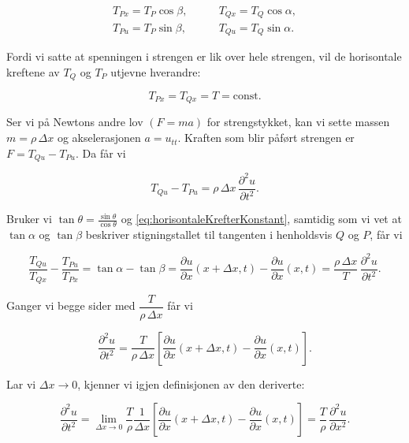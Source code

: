 \begin{align*}
  T_{Px} = T_P \cos\beta, &\qquad T_{Qx} = T_Q \cos\alpha,\\
  T_{Pu} = T_P \sin\beta, &\qquad T_{Qu} = T_Q \sin\alpha.
\end{align*}

Fordi vi satte at spenningen i strengen er lik over hele strengen, vil de horisontale kreftene
av \(T_Q\) og \(T_P\) utjevne hverandre:

\begin{equation}
  T_{Px} = T_{Qx} = T = \text{const.}
  \label{eq:horisontaleKrefterKonstant}
\end{equation}

Ser vi på Newtons andre lov \((F=ma)\) for strengstykket, kan vi sette massen \(m=\rho\,\Delta x\) og
akselerasjonen \(a=u_{tt}\). Kraften som blir påført strengen er \(F=T_{Qu}-T_{Pu}\). Da får vi

\begin{equation*}
  T_{Qu}-T_{Pu}=\rho\,\Delta x\,\frac{\partial^2 u}{\partial t^2}.
\end{equation*}

Bruker vi \(\tan\theta=\frac{\sin\theta}{\cos\theta}\) og \eqref{eq:horisontaleKrefterKonstant}, samtidig
som vi vet at \(\tan\alpha\) og \(\tan\beta\) beskriver stigningstallet til tangenten i henholdsvis \(Q\) og \(P\), får vi

\begin{equation}
  \frac{T_{Qu}}{T_{Qx}}-\frac{T_{Pu}}{T_{Px}}
  = \tan\alpha - \tan\beta
  = \frac{\partial u}{\partial x}(x+\Delta x,t)-\frac{\partial u}{\partial x}(x,t)
  = \frac{\rho\,\Delta x}{T}\,\frac{\partial^2 u}{\partial t^2}.
  \label{eq:krefterPaStykke}
\end{equation}

Ganger vi begge sider med \(\dfrac{T}{\rho\,\Delta x}\) får vi

\begin{equation}
  \frac{\partial^2 u}{\partial t^2}
  = \frac{T}{\rho\,\Delta x}\left[
     \frac{\partial u}{\partial x}(x+\Delta x,t)-\frac{\partial u}{\partial x}(x,t)
    \right].
  \label{eq:tidPartiellDerivert}
\end{equation}

Lar vi \(\Delta x\to 0\), kjenner vi igjen definisjonen av den deriverte:

\begin{equation}
  \frac{\partial^2 u}{\partial t^2}
  = \lim_{\Delta x\to 0}\frac{T}{\rho}\frac{1}{\Delta x}
    \left[\frac{\partial u}{\partial x}(x+\Delta x,t)-\frac{\partial u}{\partial x}(x,t)\right]
  = \frac{T}{\rho}\,\frac{\partial^2 u}{\partial x^2}.
  \label{eq:deltaXGarMotNull}
\end{equation}

